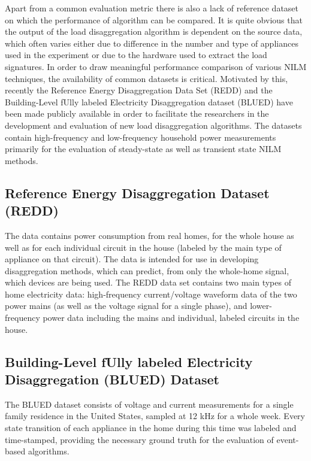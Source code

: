 Apart from a common evaluation metric there is also a lack of reference dataset on which the
performance of algorithm can be compared. It is quite obvious that the output of the load disaggregation
algorithm is dependent on the source data, which often varies either due to difference in the number
and type of appliances used in the experiment or due to the hardware used to extract the load signatures. In order to draw meaningful performance comparison of various NILM techniques,
the availability of common datasets is critical. Motivated by this, recently the Reference Energy Disaggregation Data Set (REDD) and the Building-Level fUlly labeled Electricity Disaggregation dataset (BLUED) have been made publicly available in order to facilitate the researchers in the development and evaluation of new load disaggregation algorithms. The datasets contain high-frequency and low-frequency household power measurements primarily for the evaluation of steady-state as well as transient state NILM methods.

\subsection{Reference Energy Disaggregation Dataset (REDD)}
The data contains power consumption from real
homes, for the whole house as well as for each individual circuit in
the house (labeled by the main type of appliance on that circuit).
The data is intended for use in developing disaggregation methods, which
can predict, from only the whole-home signal, which devices are being
used. The REDD data set contains two main types of home electricity data:
high-frequency current/voltage waveform data of the two power mains
(as well as the voltage signal for a single phase), and
lower-frequency power data including the mains and individual,
labeled circuits in the house. 

\subsection{Building-Level fUlly labeled Electricity Disaggregation (BLUED) Dataset}
The BLUED dataset consists of voltage and current measurements for a single family residence in the United States, sampled at 12 kHz for a whole week. Every state transition of each appliance in the home during this time was labeled and time-stamped, providing the necessary ground truth for the evaluation of event-based algorithms. 















 
 
 
 
 
 
 
 
 
 
 

 
 
 
 
 
 
 

